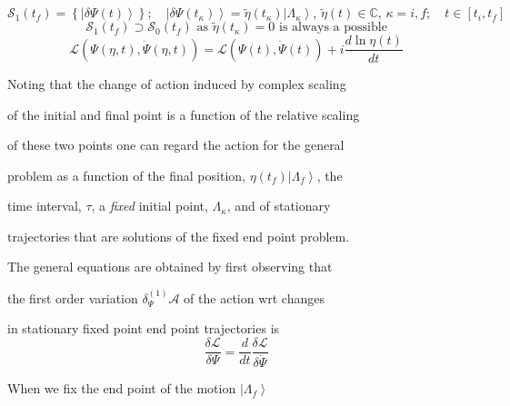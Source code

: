 \documentclass[aps,preprint]{revtex4}
\begin{document}
\begin{equation}
\mathcal{S}_{1}\left( t_{f}\right) =\left\{ \left| \delta \Psi \left(
t\right) \right\rangle \right\} ;\quad \left| \delta \Psi \left( t_{\kappa
}\right) \right\rangle =\tilde{\eta}\left( t_{\kappa }\right) \left| \Lambda
_{\kappa }\right\rangle ,\,\tilde{\eta}\left( t\right) \in \mathbb{C}%
,\,\kappa =i,f;\quad t\in \left[ t_{i},t_{f}\right]
\end{equation}%
\begin{equation}
\mathcal{S}_{1}\left( t_{f}\right) \supset \mathcal{S}_{0}\left(
t_{f}\right) \text{ as }\tilde{\eta}\left( t_{\kappa }\right) =0\text{ is
always a possible}
\end{equation}%
\begin{equation}
\mathcal{L}\left( \Psi \left( \eta ,t\right) ,\dot{\Psi}\left( \eta
,t\right) \right) =\mathcal{L}\left( \Psi \left( t\right) ,\dot{\Psi}\left(
t\right) \right) +i\frac{d\ln \eta \left( t\right) }{dt}
\end{equation}

Noting that the change of action induced by complex scaling

of the initial and final point is a function of the relative scaling

of these two points one can regard the action for the general

problem as a function of the final position, $\eta \left( t_{f}\right)
\left| \Lambda _{f}\right\rangle $, the

time interval, $\tau $, a \emph{fixed} initial point, $\Lambda _{\kappa }$,
and of stationary

trajectories that are solutions of the fixed end point problem.

\bigskip

The general equations are obtained by first observing that

the first order variation $\delta _{\Psi }^{\left( 1\right) }\mathcal{A}$ of
the action wrt changes

in stationary fixed point end point trajectories is%
\begin{equation}
\frac{\delta \mathcal{L}}{\delta \Psi }=\frac{d}{dt}\frac{\delta \mathcal{L}%
}{\delta \dot{\Psi}}
\end{equation}

\bigskip

\bigskip

When we fix the end point of the motion $\left| \Lambda _{f}\right\rangle $
\end{document}
